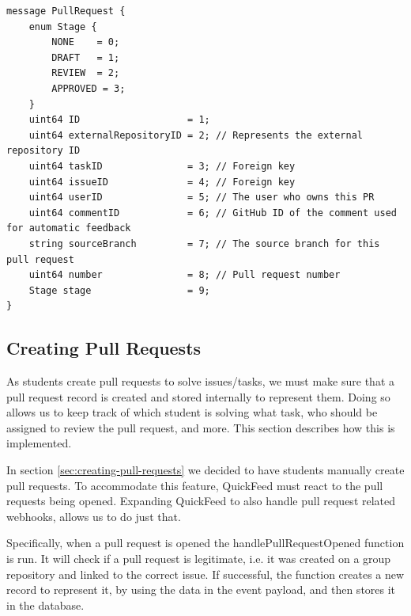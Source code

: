 \begin{lstlisting}[caption={PullRequest message}]
message PullRequest {
    enum Stage {
        NONE    = 0;
        DRAFT   = 1;
        REVIEW  = 2;
        APPROVED = 3;
    }
    uint64 ID                   = 1;
    uint64 externalRepositoryID = 2; // Represents the external repository ID
    uint64 taskID               = 3; // Foreign key
    uint64 issueID              = 4; // Foreign key
    uint64 userID               = 5; // The user who owns this PR
    uint64 commentID            = 6; // GitHub ID of the comment used for automatic feedback
    string sourceBranch         = 7; // The source branch for this pull request
    uint64 number               = 8; // Pull request number
    Stage stage                 = 9;
}
\end{lstlisting}


\subsection{Creating Pull Requests}

As students create pull requests to solve issues/tasks, we must make sure that a pull request record is created and stored internally to represent them.
Doing so allows us to keep track of which student is solving what task, who should be assigned to review the pull request, and more.
This section describes how this is implemented.

In section \ref{sec:creating-pull-requests} we decided to have students manually create pull requests.
To accommodate this feature, QuickFeed must react to the pull requests being opened.
Expanding QuickFeed to also handle pull request related webhooks, allows us to do just that.

Specifically, when a pull request is opened the handlePullRequestOpened function is run.
It will check if a pull request is legitimate, i.e. it was created on a group repository and linked to the correct issue.
If successful, the function creates a new record to represent it, by using the data in the event payload, and then stores it in the database.


